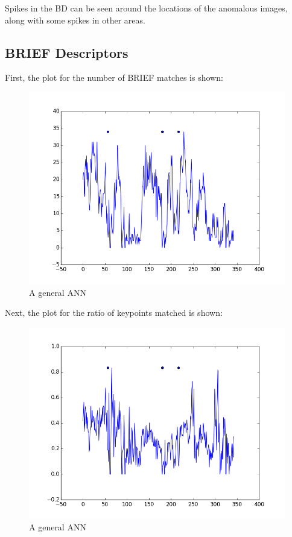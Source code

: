 Spikes in the BD can be seen around the locations of the anomalous images, along with some spikes in other areas.

\subsection{BRIEF Descriptors}

First, the plot for the number of BRIEF matches is shown:

\begin{figure}[h]
\centering
\includegraphics[scale=.50]{figures/611nummatchestest}
\caption{A general ANN}
\label{fig:tamu-fig3}
\end{figure}

Next, the plot for the ratio of keypoints matched is shown:

\begin{figure}[h]
\centering
\includegraphics[scale=.50]{figures/611matchratiostest}
\caption{A general ANN}
\label{fig:tamu-fig3}
\end{figure}

